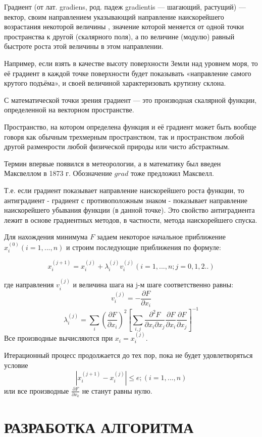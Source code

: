 Градиент (от лат. gradiens, род. падеж gradientis — шагающий, растущий) — вектор, своим направлением указывающий направление наискорейшего возрастания некоторой величины , значение которой меняется от одной точки пространства к другой (скалярного поля), а по величине (модулю) равный быстроте роста этой величины в этом направлении.

Например, если взять в качестве  высоту поверхности Земли над уровнем моря, то её градиент в каждой точке поверхности будет показывать «направление самого крутого подъёма», и своей величиной характеризовать крутизну склона.

С математической точки зрения градиент — это производная скалярной функции, определенной на векторном пространстве.

Пространство, на котором определена функция и её градиент может быть вообще говоря как обычным трехмерным пространством, так и пространством любой другой разменрости любой физической природы или чисто абстрактным.

Термин впервые появился в метеорологии, а в математику был введен Максвеллом в 1873 г. Обозначение $grad$ тоже предложил Максвелл.

Т.е. если градиент показывает направление наискорейшего роста функции, то антиградиент - градиент с противоположным знаком - показывает направление наискорейшего убывания функции (в данной точке). Это свойство антиградиента лежит в основе градиентных методов, в частности, метода наискорейшего спуска.

Для нахождения минимума $F$ задаем некоторое начальное приближение $x_i^{(0)} (i=1,...,n)$ и строим последующие приближения по формуле: 
	
$$x_{i}^{(j+1)}=x_{i}^{(j)}+\lambda_{i}^{(j)}v_{i}^{(j)} (i=1,...,n;j=0,1,2..)$$

где направления $v_i^{(j)}$ и величина шага на j-м шаге соответственно равны: 
$$v_i^{(j)}=-\frac{\partial F} {\partial x_i}$$
$$\lambda_i^{(j)}=\sum_i \left( \frac{\partial F} {\partial x_i}\right)^2 \left[\sum_{i,j} \frac{\partial^2 F} {\partial x_i \partial x_j} \frac{\partial F} {\partial x_i} \frac{\partial F} {\partial x_j} \right]^{-1} $$	
Все производные вычисляются при $x_i=x_i^{(j)}$. 

Итерационный процесс продолжается до тех пор, пока не будет удовлетворяться условие 
	$$|x_i^{(j+1)}-x_i^{(j)}| \le e; (i=1,...,n)$$
или все производные $\frac{\partial F}{\partial x_k}$ не станут равны нулю.  
\section{РАЗРАБОТКА АЛГОРИТМА}
